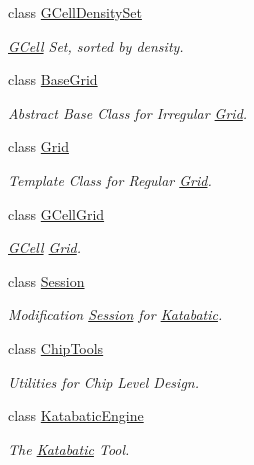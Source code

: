\begin{DoxyCompactItemize}
class \hyperlink{classKatabatic_1_1GCellDensitySet}{G\-Cell\-Density\-Set}
\begin{DoxyCompactList}\small\item\em \hyperlink{classKatabatic_1_1GCell}{G\-Cell} Set, sorted by density. \end{DoxyCompactList}\item 
class \hyperlink{classKatabatic_1_1BaseGrid}{Base\-Grid}
\begin{DoxyCompactList}\small\item\em Abstract Base Class for Irregular \hyperlink{classKatabatic_1_1Grid}{Grid}. \end{DoxyCompactList}\item 
class \hyperlink{classKatabatic_1_1Grid}{Grid}
\begin{DoxyCompactList}\small\item\em Template Class for Regular \hyperlink{classKatabatic_1_1Grid}{Grid}. \end{DoxyCompactList}\item 
class \hyperlink{classKatabatic_1_1GCellGrid}{G\-Cell\-Grid}
\begin{DoxyCompactList}\small\item\em \hyperlink{classKatabatic_1_1GCell}{G\-Cell} \hyperlink{classKatabatic_1_1Grid}{Grid}. \end{DoxyCompactList}\item 
class \hyperlink{classKatabatic_1_1Session}{Session}
\begin{DoxyCompactList}\small\item\em Modification \hyperlink{classKatabatic_1_1Session}{Session} for \hyperlink{namespaceKatabatic}{Katabatic}. \end{DoxyCompactList}\item 
class \hyperlink{classKatabatic_1_1ChipTools}{Chip\-Tools}
\begin{DoxyCompactList}\small\item\em Utilities for Chip Level Design. \end{DoxyCompactList}\item 
class \hyperlink{classKatabatic_1_1KatabaticEngine}{Katabatic\-Engine}
\begin{DoxyCompactList}\small\item\em The \hyperlink{namespaceKatabatic}{Katabatic} Tool. \end{DoxyCompactList}\end{DoxyCompactItemize}
